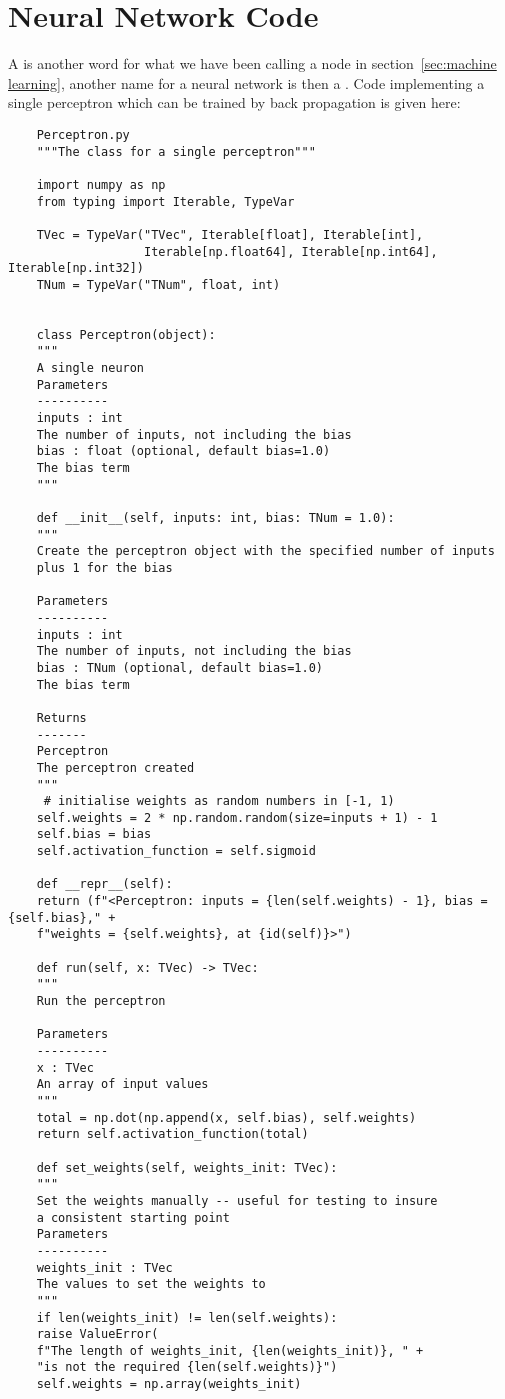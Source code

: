 \documentclass[a4paper]{article}
\begin{document}
    \section{Neural Network Code}
    A  is another word for what we have been calling a node in section~\ref{sec:machine learning}, another name for a neural network is then a .
    Code implementing a single perceptron which can be trained by back propagation is given here:
    \begin{lstlisting}
    Perceptron.py
    """The class for a single perceptron"""
    
    import numpy as np
    from typing import Iterable, TypeVar
    
    TVec = TypeVar("TVec", Iterable[float], Iterable[int],
                   Iterable[np.float64], Iterable[np.int64], Iterable[np.int32])
    TNum = TypeVar("TNum", float, int)
    
    
    class Perceptron(object):
    """
    A single neuron
    Parameters
    ----------
    inputs : int
    The number of inputs, not including the bias
    bias : float (optional, default bias=1.0)
    The bias term
    """
    
    def __init__(self, inputs: int, bias: TNum = 1.0):
    """
    Create the perceptron object with the specified number of inputs
    plus 1 for the bias
    
    Parameters
    ----------
    inputs : int
    The number of inputs, not including the bias
    bias : TNum (optional, default bias=1.0)
    The bias term
    
    Returns
    -------
    Perceptron
    The perceptron created
    """
     # initialise weights as random numbers in [-1, 1)
    self.weights = 2 * np.random.random(size=inputs + 1) - 1
    self.bias = bias
    self.activation_function = self.sigmoid
    
    def __repr__(self):
    return (f"<Perceptron: inputs = {len(self.weights) - 1}, bias = {self.bias}," +
    f"weights = {self.weights}, at {id(self)}>")
    
    def run(self, x: TVec) -> TVec:
    """
    Run the perceptron
    
    Parameters
    ----------
    x : TVec
    An array of input values
    """
    total = np.dot(np.append(x, self.bias), self.weights)
    return self.activation_function(total)
    
    def set_weights(self, weights_init: TVec):
    """
    Set the weights manually -- useful for testing to insure
    a consistent starting point
    Parameters
    ----------
    weights_init : TVec
    The values to set the weights to
    """
    if len(weights_init) != len(self.weights):
    raise ValueError(
    f"The length of weights_init, {len(weights_init)}, " +
    "is not the required {len(self.weights)}")
    self.weights = np.array(weights_init)
    

\end{lstlisting}
\end{document}

